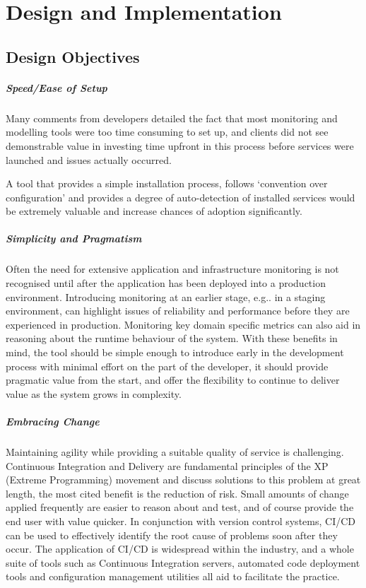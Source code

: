 \documentclass{cshonours}
\begin{document}
\chapter{Design and Implementation}

\section{Design Objectives}

\paragraph{Speed/Ease of Setup} Many comments from developers detailed the fact that most monitoring and modelling tools were too time consuming to set up, and clients did not see demonstrable value in investing time upfront in this process before services were launched and issues actually occurred. 

A tool that provides a simple installation process, follows ‘convention over configuration’ and provides a degree of auto-detection of installed services would be extremely valuable and increase chances of adoption significantly.

\paragraph{Simplicity and Pragmatism} Often the need for extensive application and infrastructure monitoring is not recognised until after the application has been deployed into a production environment. Introducing monitoring at an earlier stage, e.g.. in a staging environment, can highlight issues of reliability and performance before they are experienced in production. Monitoring key domain specific metrics can also aid in reasoning about the runtime behaviour of the system. With these benefits in mind, the tool should be simple enough to introduce early in the development process with minimal effort on the part of the developer, it should provide pragmatic value from the start, and offer the flexibility to continue to deliver value as the system grows in complexity.

\paragraph{Embracing Change}

Maintaining agility while providing a suitable quality of service is challenging. Continuous Integration and Delivery are fundamental principles of the XP (Extreme Programming) movement and discuss solutions to this problem at great length, the most cited benefit is the reduction of risk. Small amounts of change applied frequently are easier to reason about and test, and of course provide the end user with value quicker. In conjunction with version control systems, CI/CD can be used to effectively identify the root cause of problems soon after they occur. The application of CI/CD is widespread within the industry, and a whole suite of tools such as Continuous Integration servers, automated code deployment tools and configuration management utilities all aid to facilitate the practice.
\end{document}
